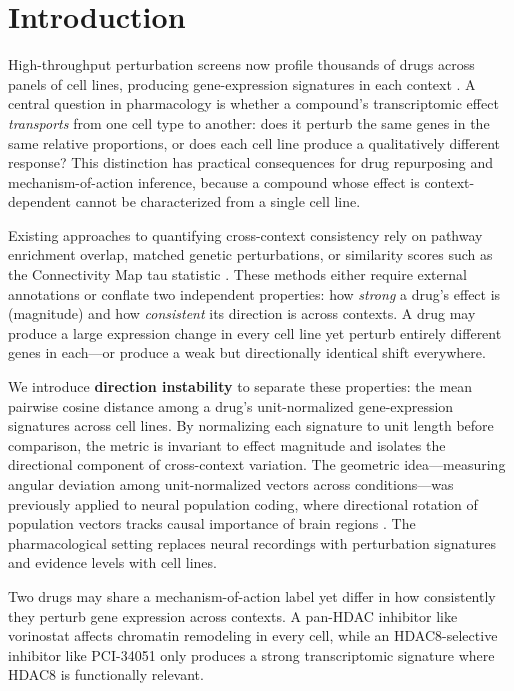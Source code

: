 \documentclass[11pt]{article}
\begin{document}
\section{Introduction}

High-throughput perturbation screens now profile thousands of drugs
across panels of cell lines, producing gene-expression signatures in
each context \citep{subramanian2017next,lamb2006connectivity}.  A central
question in pharmacology is whether a compound's transcriptomic effect
\emph{transports} from one cell type to another: does it perturb the
same genes in the same relative proportions, or does each cell line
produce a qualitatively different response?  This distinction has
practical consequences for drug repurposing and mechanism-of-action
inference, because a compound whose effect is context-dependent cannot
be characterized from a single cell line.

Existing approaches to quantifying cross-context consistency rely on
pathway enrichment overlap, matched genetic perturbations, or
similarity scores such as the Connectivity Map tau statistic
\citep{subramanian2017next}.  These methods either require external
annotations or conflate two independent properties: how \emph{strong}
a drug's effect is (magnitude) and how \emph{consistent} its
direction is across contexts.  A drug may produce a large expression
change in every cell line yet perturb entirely different genes in
each---or produce a weak but directionally identical shift everywhere.

We introduce \textbf{direction instability} to separate these
properties: the mean pairwise cosine distance among a drug's
unit-normalized gene-expression signatures across cell lines.  By
normalizing each signature to unit length before comparison, the metric
is invariant to effect magnitude and isolates the directional component
of cross-context variation.  The geometric idea---measuring angular
deviation among unit-normalized vectors across conditions---was
previously applied to neural population coding, where directional
rotation of population vectors tracks causal importance of brain regions
\citep{tower2026bracket}.  The pharmacological setting replaces neural
recordings with perturbation signatures and evidence levels with cell
lines.

Two drugs may share a mechanism-of-action label yet differ in how
consistently they perturb gene expression across contexts.  A pan-HDAC
inhibitor like vorinostat affects chromatin remodeling in every cell,
while an HDAC8-selective inhibitor like PCI-34051 only produces a strong
transcriptomic signature where HDAC8 is functionally relevant.
\end{document}
